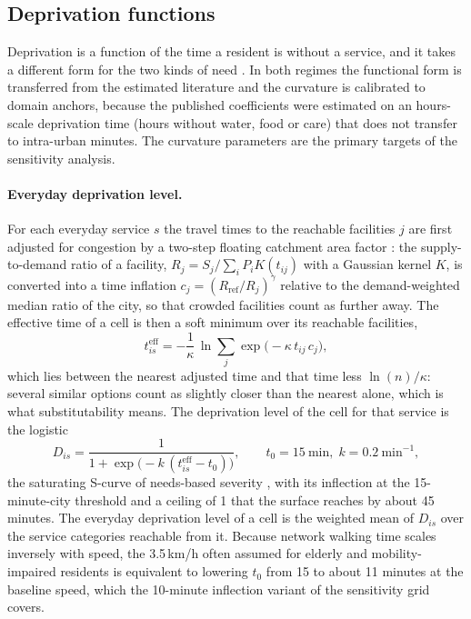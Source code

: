 \documentclass[11pt]{article}
\begin{document}
\subsection{Deprivation functions}\label{sec:m-deprivation}

Deprivation is a function of the time a resident is without a service, and
it takes a different form for the two kinds of need
\citep{holguinveras2013objective,holguinveras2016econometric}. In both
regimes the functional form is transferred from the estimated literature
and the curvature is calibrated to domain anchors, because the published
coefficients were estimated on an hours-scale deprivation time (hours
without water, food or care) that does not transfer to intra-urban
minutes. The curvature parameters are the primary targets of the
sensitivity analysis.

\paragraph{Everyday deprivation level.} For each everyday service $s$ the
travel times to the reachable facilities $j$ are first adjusted for
congestion by a two-step floating catchment area factor
\citep{luo2003measures,luo2009enhanced}: the supply-to-demand ratio of a
facility, $R_j = S_j / \sum_i P_i K(t_{ij})$ with a Gaussian kernel $K$,
is converted into a time inflation $c_j = (R_{\mathrm{ref}} / R_j)^{\gamma}$
relative to the demand-weighted median ratio of the city, so that crowded
facilities count as further away. The effective time of a cell is then a
soft minimum over its reachable facilities,
\begin{equation}
t^{\mathrm{eff}}_{is} = -\frac{1}{\kappa}\,\ln \sum_j \exp\!\big(-\kappa\, t_{ij}\, c_j\big),
\label{eq:softmin}
\end{equation}
which lies between the nearest adjusted time and that time less
$\ln(n)/\kappa$: several similar options count as slightly closer than the
nearest alone, which is what substitutability means. The deprivation
level of the cell for that service is the logistic
\begin{equation}
D_{is} = \frac{1}{1 + \exp\!\big(-k\,(t^{\mathrm{eff}}_{is} - t_0)\big)},
\qquad t_0 = 15\ \mathrm{min},\; k = 0.2\ \mathrm{min}^{-1},
\label{eq:dlf}
\end{equation}
the saturating S-curve of needs-based severity \citep{wang2017deprivation},
with its inflection at the 15-minute-city threshold
\citep{moreno2021fifteenminute} and a ceiling of 1 that the surface
reaches by about 45 minutes. The everyday deprivation level of a cell is
the weighted mean of $D_{is}$ over the service categories reachable from
it. Because network walking time scales inversely with speed, the
3.5\,km/h often assumed for elderly and mobility-impaired residents is
equivalent to lowering $t_0$ from 15 to about 11 minutes at the baseline
speed, which the 10-minute inflection variant of the sensitivity grid
covers.
\end{document}
